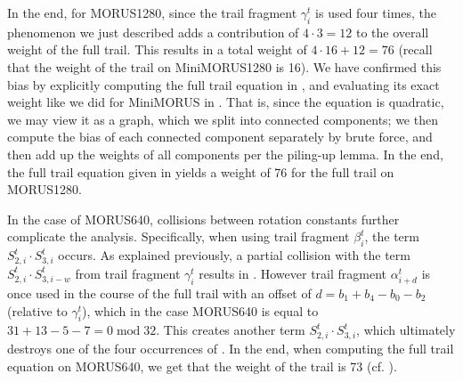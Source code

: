 \documentclass{llncs}
\newcommand{\cipher}[1]{\textsf{#1}}
\begin{document}
In the end, for \cipher{MORUS1280}, since the trail fragment $\gamma^t_i$ is used four times, the phenomenon we just described adds a contribution of $4 \cdot 3 = 12$ to the overall weight of the full trail. This results in a total weight of $4 \cdot 16 + 12 = 76$ (recall that the weight of the trail on \cipher{MiniMORUS1280} is 16). We have confirmed this bias by explicitly computing the full trail equation in , and evaluating its exact weight like we did for \cipher{MiniMORUS} in . That is, since the equation is quadratic, we may view it as a graph, which we split into connected components; we then compute the bias of each connected component separately by brute force, and then add up the weights of all components per the piling-up lemma. In the end, the full trail equation given in  yields a weight of 76 for the full trail on \cipher{MORUS1280}.

In the case of \cipher{MORUS640}, collisions between rotation constants further complicate the analysis. Specifically, when using trail fragment $\beta^t_i$, the term $S^t_{2,i} \cdot S^t_{3,i}$ occurs. As explained previously, a partial collision with the term $S^t_{2,i} \cdot S^t_{3,i-w}$ from trail fragment $\gamma^t_i$ results in . However trail fragment $\alpha^t_{i+d}$ is once used in the course of the full trail with an offset of $d = b_1+b_4-b_0-b_2$ (relative to $\gamma^t_i$), which in the case \cipher{MORUS640} is equal to $31+13-5-7 = 0 \;\text{mod}\; 32$. This creates another term $S^t_{2,i} \cdot S^t_{3,i}$, which ultimately destroys one of the four occurrences of . In the end, when computing the full trail equation on \cipher{MORUS640}, we get that the weight of the trail is 73 (cf. ).

\end{document}
